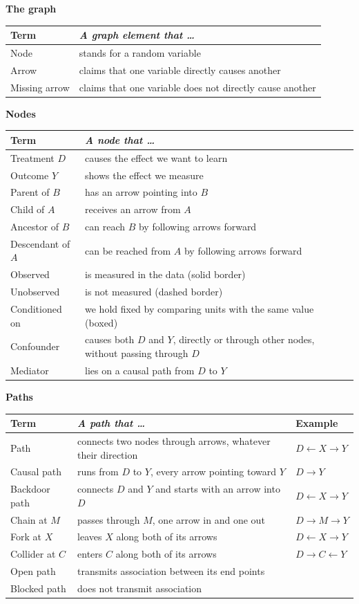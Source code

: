 \documentclass[10pt]{article}
\newcommand{\head}[1]{\par\vspace{5pt}{\color{accent}\large\bfseries #1}\par\vspace{-1pt}{\color{accent}\rule{\linewidth}{0.8pt}}\par\vspace{2pt}}
\newcommand{\sub}[1]{\par\vspace{3pt}\textbf{#1}\par}
\begin{document}
\begin{minipage}[t]{0.49\textwidth}
\head{Vocabulary}
\sub{The graph}
\begin{tabularx}{\linewidth}{@{}lX@{}}
\toprule
Term & \textit{A graph element that \dots} \\
\midrule
Node & stands for a random variable \\
Arrow & claims that one variable directly causes another \\
Missing arrow & claims that one variable does not directly cause another \\
\bottomrule
\end{tabularx}

\sub{Nodes}
\begin{tabularx}{\linewidth}{@{}lX@{}}
\toprule
Term & \textit{A node that \dots} \\
\midrule
Treatment $D$ & causes the effect we want to learn \\
Outcome $Y$ & shows the effect we measure \\
Parent of $B$ & has an arrow pointing into $B$ \\
Child of $A$ & receives an arrow from $A$ \\
Ancestor of $B$ & can reach $B$ by following arrows forward \\
Descendant of $A$ & can be reached from $A$ by following arrows forward \\
Observed & is measured in the data (solid border) \\
Unobserved & is not measured (dashed border) \\
Conditioned on & we hold fixed by comparing units with the same value (boxed) \\
Confounder & causes both $D$ and $Y$, directly or through other nodes, without passing through $D$ \\
Mediator & lies on a causal path from $D$ to $Y$ \\
\bottomrule
\end{tabularx}

\sub{Paths}
\begin{tabularx}{\linewidth}{@{}lXl@{}}
\toprule
Term & \textit{A path that \dots} & Example \\
\midrule
Path & connects two nodes through arrows, whatever their direction & $D \leftarrow X \to Y$ \\
Causal path & runs from $D$ to $Y$, every arrow pointing toward $Y$ & $D \to Y$ \\
Backdoor path & connects $D$ and $Y$ and starts with an arrow into $D$ & $D \leftarrow X \to Y$ \\
Chain at $M$ & passes through $M$, one arrow in and one out & $D \to M \to Y$ \\
Fork at $X$ & leaves $X$ along both of its arrows & $D \leftarrow X \to Y$ \\
Collider at $C$ & enters $C$ along both of its arrows & $D \to C \leftarrow Y$ \\
Open path & transmits association between its end points & \\
Blocked path & does not transmit association & \\
\bottomrule
\end{tabularx}


\end{minipage}
\end{document}
